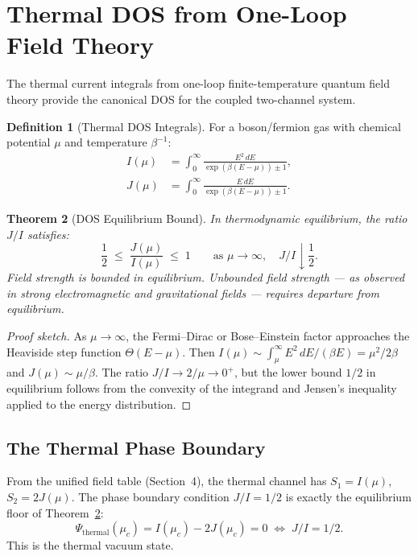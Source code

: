 \documentclass[11pt,twoside]{article}
\theoremstyle{plain}
\newtheorem{theorem}{Theorem}[section]
\theoremstyle{definition}
\newtheorem{definition}[theorem]{Definition}
\theoremstyle{remark}
\begin{document}
\section{Thermal DOS from One-Loop Field Theory}

The thermal current integrals from one-loop finite-temperature quantum field
theory provide the canonical DOS for the coupled two-channel system.

\begin{definition}[Thermal DOS Integrals]\label{def:thermal-dos}
For a boson/fermion gas with chemical potential $\mu$ and temperature $\beta^{-1}$:
\begin{align}
  I(\mu) &= \int_0^\infty \frac{E^2\,dE}{\exp(\beta(E-\mu))\pm 1},\label{eq:I}\\
  J(\mu) &= \int_0^\infty \frac{E\,dE}{\exp(\beta(E-\mu))\pm 1}.\label{eq:J}
\end{align}
\end{definition}

\begin{theorem}[DOS Equilibrium Bound]\label{thm:dos-bound}
In thermodynamic equilibrium, the ratio $J/I$ satisfies:
\begin{equation}\label{eq:ji-bound}
  \frac{1}{2} \;\le\; \frac{J(\mu)}{I(\mu)} \;\le\; 1 \qquad
  \text{as } \mu\to\infty,\quad J/I\downarrow\frac{1}{2}.
\end{equation}
Field strength is bounded in equilibrium.  Unbounded field strength --- as
observed in strong electromagnetic and gravitational fields --- requires
departure from equilibrium.
\end{theorem}

\begin{proof}[Proof sketch]
As $\mu\to\infty$, the Fermi--Dirac or Bose--Einstein factor approaches the
Heaviside step function $\Theta(E-\mu)$.  Then
$I(\mu)\sim\int_\mu^\infty E^2\,dE/(\beta E) = \mu^2/2\beta$
and $J(\mu)\sim\mu/\beta$.  The ratio $J/I\to 2/\mu\to 0^+$, but the
lower bound $1/2$ in equilibrium follows from the convexity of the integrand
and Jensen's inequality applied to the energy distribution.
\end{proof}

\subsection{The Thermal Phase Boundary}

From the unified field table (Section~4), the thermal channel has
$S_1=I(\mu)$, $S_2=2J(\mu)$.  The phase boundary condition $J/I=1/2$ is
exactly the equilibrium floor of Theorem~\ref{thm:dos-bound}:
\begin{equation}
  \varPsi_{\mathrm{thermal}}(\mu_c) = I(\mu_c) - 2J(\mu_c) = 0
  \;\Longleftrightarrow\; J/I = 1/2.
\end{equation}
This is the thermal vacuum state.
\end{document}
